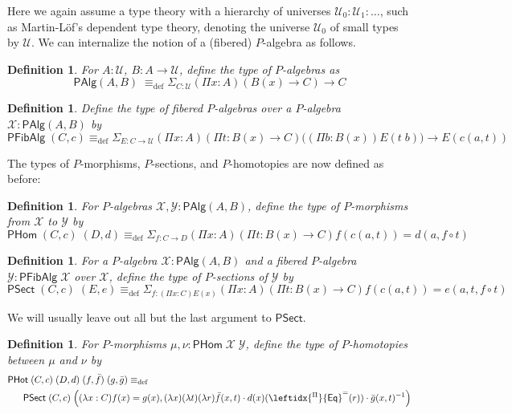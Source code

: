 \documentclass[10pt,a4paper,oneside,reqno]{amsart}
\numberwithin{equation}{section}
\theoremstyle{mythm}
\theoremstyle{mydef}
\newtheorem{definition}[theorem]{Definition}
\theoremstyle{myrmk}
\newcommand{\deq}{\equiv}
\newcommand{\defeq}{\deq_{\mathrm{def}}}
\newcommand{\U}{\mathcal{U}}
\newcommand{\ct}{\cdot}
\newcommand{\funext}{\leftidx{^\Pi}{\mathsf{Eq}}^{=}}
\newcommand{\sm}[1]{\Sigma_{#1}}
\newcommand{\WCell}{\mathsf{PHot}}
\newcommand{\WAlg}{\mathsf{PAlg}}
\newcommand{\WFibAlg}{\mathsf{PFibAlg}}
\newcommand{\WHom}{\mathsf{PHom}}
\newcommand{\WFibHom}{\mathsf{PSect}}
\newcommand{\X}{\mathcal{X}}
\newcommand{\Y}{\mathcal{Y}}
\begin{document}
Here we again assume a type theory with a hierarchy of universes $\U_0 : \U_1 : \ldots$, such as Martin-L{\"o}f's dependent type theory, denoting the universe $\U_0$ of small types by $\U$. We can internalize the notion of a (fibered) $P$-algebra as follows.

\begin{definition}\label{def:WAlg}
For $A:\U$, $B : A \to \U$, define the type of \emph{$P$-algebras} as
\[\WAlg(A,B) \; \defeq \sm{C : \U} (\Pi x:A) (B(x) \to C) \to C \]
\end{definition}

\begin{definition}\label{def:WFibAlg}
Define the type of \emph{fibered $P$-algebras} over a $P$-algebra $\X : \WAlg(A,B)$ by
\[\WFibAlg \; (C,c) \defeq \sm{E : C \to \U} (\Pi x:A) (\Pi t: B(x) \to C) \big((\Pi b:B(x)) E(t \;b) \big) \to E(c(a,t)) \]
\end{definition}

\noindent The types of $P$-morphisms, $P$-sections, and $P$-homotopies are now defined as before:

\begin{definition}\label{def:WHom}
For $P$-algebras $\X,\Y : \WAlg(A,B)$, define the type of \emph{$P$-morphisms} from $\X$ to $\Y$ by
\[ \WHom \; (C,c) \; (D,d) \defeq \sm{f:C\to D} (\Pi x:A) (\Pi t: B(x) \to C) f(c(a,t)) = d(a,f \circ t) \]
\end{definition}

\begin{definition}\label{def:WFibHom}
For a $P$-algebra $\X : \WAlg(A,B)$ and a fibered $P$-algebra $\Y : \WFibAlg \; \X$ over $\X$, define the type of \emph{$P$-sections} of $\Y$ by
\[ \WFibHom \; (C,c) \; (E,e) \defeq \sm{f:(\Pi x:C)E(x)}(\Pi x:A) (\Pi t: B(x) \to C) f(c(a,t)) = e(a,t,f \circ t) \]
\end{definition}
We will usually leave out all but the last argument to $\WFibHom$.

\begin{definition}\label{def:WCell}
For $P$-morphisms $\mu, \nu : \WHom \; \X \; \Y$, define the type of \emph{$P$-homotopies} between $\mu$ and $\nu$ by
\begin{align*} 
& \WCell \; (C,c) \; (D,d) \; (f,\bar{f}) \; (g,\bar{g}) \defeq \\ & \;\;\; \;\;\;\WFibHom \; (C,c) \; \Big((\lambda x:C) f(x) = g(x), (\lambda x) (\lambda t) (\lambda r) \bar{f}(x,t) \ct d(x)(\funext(r)) \ct \bar{g}(x,t)^{-1}\Big)
\end{align*}
\end{definition}
\end{document}
